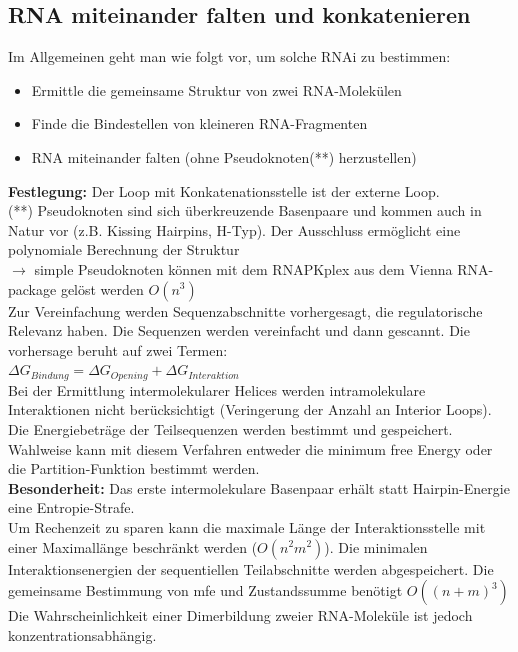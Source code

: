 \subsection{RNA miteinander falten und konkatenieren}

Im Allgemeinen geht man wie folgt vor, um solche RNAi zu bestimmen:
\begin{itemize}
\item Ermittle die gemeinsame Struktur von zwei RNA-Molekülen
\item Finde die Bindestellen von kleineren RNA-Fragmenten
\item RNA miteinander falten (ohne Pseudoknoten(**) herzustellen)
\end{itemize}  
\textbf{Festlegung:} Der Loop mit Konkatenationsstelle ist der externe Loop. \\
(**) Pseudoknoten sind sich überkreuzende Basenpaare und kommen auch in Natur vor (z.B. Kissing Hairpins, H-Typ). Der Ausschluss ermöglicht eine polynomiale Berechnung der Struktur \\
$\rightarrow$ simple Pseudoknoten können mit dem RNAPKplex aus dem Vienna RNA-package gelöst werden $O(n^3)$ \\

Zur Vereinfachung werden Sequenzabschnitte vorhergesagt, die regulatorische Relevanz haben. Die Sequenzen werden vereinfacht und dann gescannt. Die vorhersage beruht auf zwei Termen:\\
$\Delta G_{Bindung} = \Delta G_{Opening} + \Delta G_{Interaktion}$\\
Bei der Ermittlung intermolekularer Helices werden intramolekulare Interaktionen nicht berücksichtigt (Veringerung der Anzahl an Interior Loops). Die Energiebeträge der Teilsequenzen werden bestimmt und gespeichert. Wahlweise kann mit diesem Verfahren entweder die minimum free Energy oder die Partition-Funktion bestimmt werden.\\
\textbf{Besonderheit:} Das erste intermolekulare Basenpaar erhält statt Hairpin-Energie eine Entropie-Strafe.\\
Um Rechenzeit zu sparen kann die maximale Länge der Interaktionsstelle mit einer Maximallänge beschränkt werden ($O(n^2m^2)$). Die minimalen Interaktionsenergien der sequentiellen Teilabschnitte werden abgespeichert. Die gemeinsame Bestimmung von mfe und Zustandssumme benötigt $O((n+m)^3)$\\ 
Die Wahrscheinlichkeit einer Dimerbildung zweier RNA-Moleküle ist jedoch konzentrationsabhängig.

